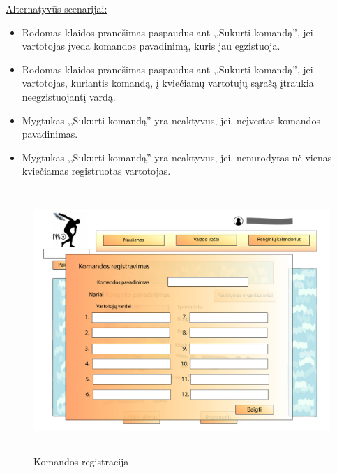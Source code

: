 \documentclass{VUMIFPSkursinis}
\begin{document}
\begin{enumerate} [label = \textbf{U\arabic*.}]
				\underline{Alternatyvūs scenarijai:}
				\begin{itemize}
					\item Rodomas klaidos pranešimas paspaudus ant ,,Sukurti komandą'', jei vartotojas įveda komandos pavadinimą, kuris jau egzistuoja.
					\item Rodomas klaidos pranešimas paspaudus ant ,,Sukurti komandą'', jei vartotojas, kuriantis komandą, į kviečiamų vartotujų sąrašą įtraukia neegzistuojantį vardą.
					\item Mygtukas ,,Sukurti komandą'' yra neaktyvus, jei, neįvestas komandos pavadinimas.
					\item Mygtukas ,,Sukurti komandą'' yra neaktyvus, jei, nenurodytas nė vienas kviečiamas registruotas vartotojas.
				\end{itemize}

				\begin{figure}[H]
					\centering
					\includegraphics[width=\textwidth, height=10cm, keepaspectratio]{img/PSI4/renginioPuslapisRegistruotiKomanda-01.jpg}
					\caption{Komandos registracija}
					\label{fig:uzd_registruotiKomanda}
				\end{figure}
				

\end{enumerate}
\end{document}
